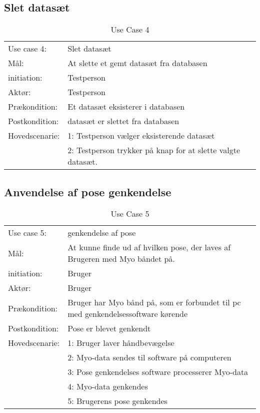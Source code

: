 \subsection{Slet datasæt}
\begin{center}
	\begin{table}[htbp]
		\begin{tabular}{lp{10cm}}
			\rowcolor{grey} Use case 4:	& Slet datasæt \\
			Mål:	& At slette et gemt datasæt fra databasen \\
			initiation:	& Testperson\\
			Aktør: & Testperson\\
			Prækondition: & Et datasæt eksisterer i databasen\\
			Postkondition: & datasæt er slettet fra databasen\\
			Hovedscenarie: & 1: Testperson vælger eksisterende datasæt\\
			& 2: Testperson trykker på knap for at slette valgte datasæt.
		\end{tabular}
		\caption{Use Case 4}
	\end{table}
\end{center}

\subsection{Anvendelse af pose genkendelse}
\begin{center}
	\begin{table}[htbp]
		\begin{tabular}{lp{10cm}}
			\rowcolor{grey} Use case 5:		& genkendelse af pose\\
			Mål: & At kunne finde ud af hvilken pose, der laves af Brugeren med Myo båndet på. \\
			initiation:	& Bruger \\
			Aktør: & Bruger\\
			Prækondition: & Bruger har Myo bånd på, som er forbundet til pc med genkendelsessoftware kørende \\
			Postkondition: & Pose er blevet genkendt \\
			Hovedscenarie: & 1: Bruger laver håndbevægelse \\
			& 2: Myo-data sendes til software på computeren\\
			& 3: Pose genkendelses software processerer Myo-data\\
			& 4: Myo-data genkendes\\
			& 5: Brugerens pose genkendes\\
		\end{tabular}
		\caption{Use Case 5}
	\end{table}
\end{center}

